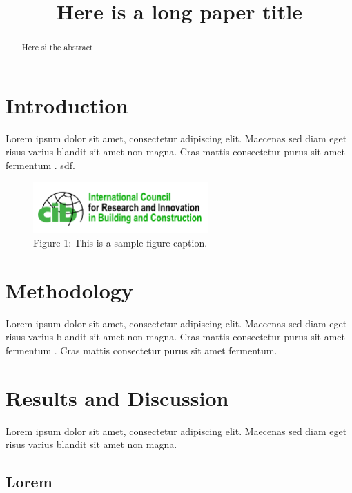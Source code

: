 
\geometry{top=3cm, bottom=2.5cm, left=3cm, right=3cm} %

\title{Here is a long paper title} 

\newcommand{\shorttitle}{My Short Paper Title}
\newcommand{\authorname}{Your Name}



\maketitle


\begin{abstract}
Here si the abstract
\end{abstract}

\thispagestyle{empty}

\section{Introduction}
Lorem ipsum dolor sit amet, consectetur adipiscing elit. Maecenas sed diam eget risus varius blandit sit amet non magna. Cras mattis consectetur purus sit amet fermentum \parencite{sample_citation1}. sdf.
\lipsum[5]
\begin{figure}[h!]
  \centering
  \includegraphics[width=0.6\textwidth]{img/cib_w78_logo_version_final.png}

  \caption{Figure 1: This is a sample figure caption.} 
\end{figure}


\section{Methodology}
Lorem ipsum dolor sit amet, consectetur adipiscing elit. Maecenas sed diam eget risus varius blandit sit amet non magna. Cras mattis consectetur purus sit amet fermentum \parencite{sample_citation2}.  Cras mattis consectetur purus sit amet fermentum. 

\section{Results and Discussion}
Lorem ipsum dolor sit amet, consectetur adipiscing elit. Maecenas sed diam eget risus varius blandit sit amet non magna. 

\subsection{Lorem}
\lipsum[1-10]  %

\printbibliography 
